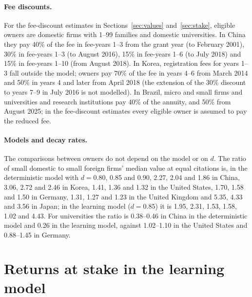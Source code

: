 \paragraph{Fee discounts.} For the fee-discount estimates in Sections~\ref{sec:values} and~\ref{sec:stake}, eligible owners are domestic firms with 1--99
families and domestic universities. In China they pay 40\% of the fee in fee-years 1--3 from the grant year (to
February 2001), 30\% in fee-years 1--3 (to August 2016), 15\% in fee-years 1--6 (to July 2018) and 15\% in fee-years
1--10 (from August 2018). In Korea, registration fees for years 1--3 fall outside the model; owners pay 70\% of the
fee in years 4--6 from March 2014 and 50\% in years 4 and later from April 2018 (the extension of the 30\% discount to
years 7--9 in July 2016 is not modelled). In Brazil, micro and small firms and universities and research
institutions pay 40\% of the annuity, and 50\% from August 2025; in the fee-discount estimates every eligible owner is assumed to pay the reduced fee.

\paragraph{Models and decay rates.} The comparisons between owners do not depend on the model or on $d$. The ratio
of small domestic to small foreign firms' median value at equal citations is, in the deterministic model with
$d = 0.80$, 0.85 and 0.90, 2.27, 2.04 and 1.86 in China, 3.06, 2.72 and 2.46 in Korea, 1.41, 1.36 and 1.32 in the
United States, 1.70, 1.58 and 1.50 in Germany, 1.31, 1.27 and 1.23 in the United Kingdom and 5.35, 4.33 and 3.56 in
Japan; in the learning model ($d = 0.85$) it is 1.95, 2.31, 1.53, 1.58, 1.02 and 4.43. For universities the ratio
is 0.38--0.46 in China in the deterministic model and 0.26 in the learning model, against 1.02--1.10 in the United
States and 0.88--1.45 in Germany.





\clearpage
\newpage 

\section{Returns at stake in the learning model}\label{app:leverslearning}


